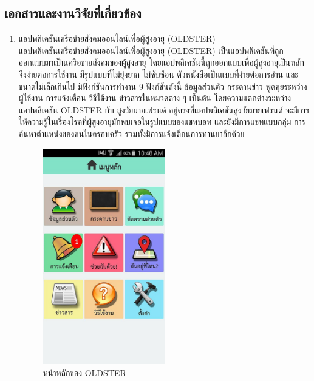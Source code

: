 \begin{enumerate}
\section{เอกสารและงานวิจัยที่เกี่ยวข้อง}
\begin{enumerate}[label=2.2.\arabic*)]
\item แอปพลิเคชันเครือข่ายสังคมออนไลน์เพื่อผู้สูงอายุ (OLDSTER) \\ 
แอปพลิเคชันเครือข่ายสังคมออนไลน์เพื่อผู้สูงอายุ (OLDSTER) \cite{oldsterref} เป็นแอปพลิเคชันที่ถูกออกแบบมาเป็นเครือข่ายสังคมของผู้สูงอายุ โดยแอปพลิเคชันนี้ถูกออกแบบเพื่อผู้สูงอายุเป็นหลัก จึงง่ายต่อการใช้งาน มีรูปแบบที่ไม่ยุ่งยาก ไม่ซับซ้อน ตัวหนังสือเป็นแบบที่ง่ายต่อการอ่าน และขนาดไม่เล็กเกินไป 
มีฟังก์ชันการทำงาน 9 ฟังก์ชันดังนี้ ข้อมูลส่วนตัว กระดานข่าว พูดคุยระหว่างผู้ใช้งาน การแจ้งเตือน วิธีใช้งาน ข่าวสารในหมวดต่าง ๆ เป็นต้น โดยความแตกต่างระหว่างแอปพลิเคชัน OLDSTER กับ สูงวัยมายเฟรนด์ อยู่ตรงที่แอปพลิเคชันสูงวัยมายเฟรนด์
จะมีการให้ความรู้ในเรื่องโรคที่ผู้สูงอายุมักพบเจอในรูปแบบของแชทบอท และยังมีการแชทแบบกลุ่ม การค้นหาตำแหน่งของคนในครอบครัว รวมทั้งมีการแจ้งเตือนการทานยาอีกด้วย
\begin{figure}[H]
\centering
\includegraphics[width=0.5\textwidth]{Figures/2/ref1}
\caption{หน้าหลักของ OLDSTER}
\label{Fig:ref1}
\end{figure}


\end{enumerate}
\end{enumerate}

